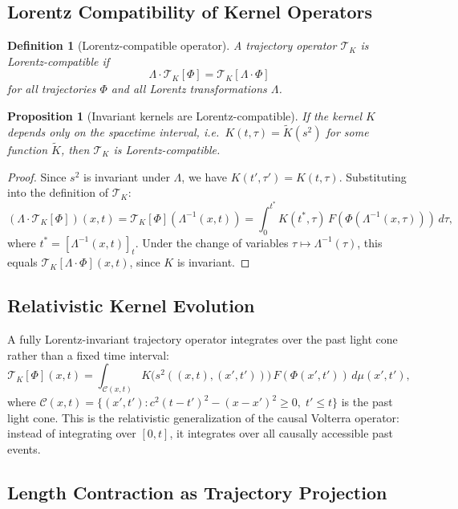 \documentclass[12pt]{article}
\newtheorem{proposition}[theorem]{Proposition}
\newtheorem{definition}[theorem]{Definition}
\newcommand{\TK}{\mathcal{T}_K}
\begin{document}
\subsection{Lorentz Compatibility of Kernel Operators}

\begin{definition}[Lorentz-compatible operator]
A trajectory operator $\TK$ is \emph{Lorentz-compatible} if
\[
  \Lambda\cdot\TK[\Phi] = \TK[\Lambda\cdot\Phi]
\]
for all trajectories $\Phi$ and all Lorentz transformations $\Lambda$.
\end{definition}

\begin{proposition}[Invariant kernels are Lorentz-compatible]
\label{prop:lorentz}
If the kernel $K$ depends only on the spacetime interval, i.e.\
$K(t,\tau) = \tilde{K}(s^2)$ for some function $\tilde{K}$, then
$\TK$ is Lorentz-compatible.
\end{proposition}

\begin{proof}
Since $s^2$ is invariant under $\Lambda$, we have $K(t',\tau') = K(t,\tau)$.
Substituting into the definition of $\TK$:
\[
  (\Lambda\cdot\TK[\Phi])(x,t)
  = \TK[\Phi](\Lambda^{-1}(x,t))
  = \int_0^{t^*} K(t^*,\tau)\,F(\Phi(\Lambda^{-1}(x,\tau)))\,d\tau,
\]
where $t^* = [\Lambda^{-1}(x,t)]_t$. Under the change of variables
$\tau \mapsto \Lambda^{-1}(\tau)$, this equals $\TK[\Lambda\cdot\Phi](x,t)$,
since $K$ is invariant.
\end{proof}

\subsection{Relativistic Kernel Evolution}

A fully Lorentz-invariant trajectory operator integrates over the past
light cone rather than a fixed time interval:
\[
  \TK[\Phi](x,t)
  = \int_{\mathcal{C}(x,t)} K\bigl(s^2((x,t),(x',t'))\bigr)\,
    F(\Phi(x',t'))\, d\mu(x',t'),
\]
where $\mathcal{C}(x,t) = \{(x',t') : c^2(t-t')^2 - (x-x')^2 \geq 0,\;
t' \leq t\}$ is the past light cone. This is the relativistic generalization
of the causal Volterra operator: instead of integrating over $[0,t]$, it
integrates over all causally accessible past events.

\subsection{Length Contraction as Trajectory Projection}
\end{document}
